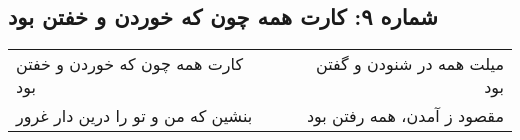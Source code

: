 \begin{center}
\section*{شماره ۹: کارت همه چون که خوردن و خفتن بود}
\label{sec:009}
\begin{longtable}{l p{0.5cm} r}
کارت همه چون که خوردن و خفتن بود
&&
میلت همه در شنودن و گفتن بود
\\
بنشین که من و تو را درین دار غرور
&&
مقصود ز آمدن، همه رفتن بود
\\
\end{longtable}
\end{center}
